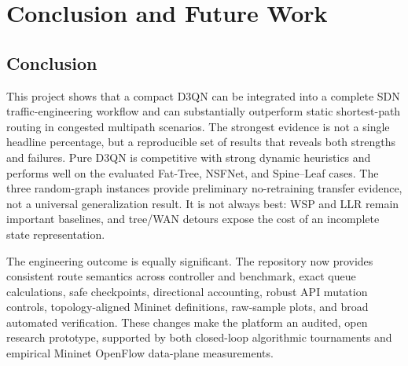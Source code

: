 \documentclass[12pt,a4paper,oneside]{report}
\begin{document}
\chapter{Conclusion and Future Work}
\label{chap:conclusion}

\section{Conclusion}
This project shows that a compact D3QN can be integrated into a complete SDN traffic-engineering workflow and can substantially outperform static shortest-path routing in congested multipath scenarios. The strongest evidence is not a single headline percentage, but a reproducible set of results that reveals both strengths and failures. Pure D3QN is competitive with strong dynamic heuristics and performs well on the evaluated Fat-Tree, NSFNet, and Spine--Leaf cases. The three random-graph instances provide preliminary no-retraining transfer evidence, not a universal generalization result. It is not always best: WSP and LLR remain important baselines, and tree/WAN detours expose the cost of an incomplete state representation.

The engineering outcome is equally significant. The repository now provides consistent route semantics across controller and benchmark, exact queue calculations, safe checkpoints, directional accounting, robust API mutation controls, topology-aligned Mininet definitions, raw-sample plots, and broad automated verification. These changes make the platform an audited, open research prototype, supported by both closed-loop algorithmic tournaments and empirical Mininet OpenFlow data-plane measurements.
\end{document}
